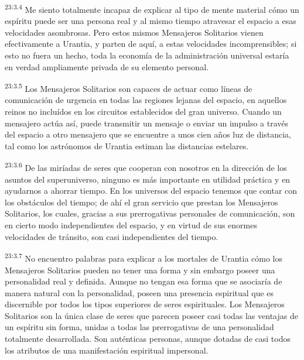 \par
\textsuperscript{23:3.4} Me siento totalmente incapaz de explicar al tipo de mente material cómo un espíritu puede ser una persona real y al mismo tiempo atravesar el espacio a esas velocidades asombrosas. Pero estos mismos Mensajeros Solitarios vienen efectivamente a Urantia, y parten de aquí, a estas velocidades incomprensibles; si esto no fuera un hecho, toda la economía de la administración universal estaría en verdad ampliamente privada de su elemento personal.

\par
\textsuperscript{23:3.5} Los Mensajeros Solitarios son capaces de actuar como líneas de comunicación de urgencia en todas las regiones lejanas del espacio, en aquellos reinos no incluídos en los circuitos establecidos del gran universo. Cuando un mensajero actúa así, puede transmitir un mensaje o enviar un impulso a través del espacio a otro mensajero que se encuentre a unos cien años luz de distancia, tal como los astrónomos de Urantia estiman las distancias estelares.

\par
\textsuperscript{23:3.6} De las miríadas de seres que cooperan con nosotros en la dirección de los asuntos del superuniverso, ninguno es más importante en utilidad práctica y en ayudarnos a ahorrar tiempo. En los universos del espacio tenemos que contar con los obstáculos del tiempo; de ahí el gran servicio que prestan los Mensajeros Solitarios, los cuales, gracias a sus prerrogativas personales de comunicación, son en cierto modo independientes del espacio, y en virtud de sus enormes velocidades de tránsito, son casi independientes del tiempo.

\par
\textsuperscript{23:3.7} No encuentro palabras para explicar a los mortales de Urantia cómo los Mensajeros Solitarios pueden no tener una forma y sin embargo poseer una personalidad real y definida. Aunque no tengan esa forma que se asociaría de manera natural con la personalidad, poseen una presencia espiritual que es discernible por todos los tipos superiores de seres espirituales. Los Mensajeros Solitarios son la única clase de seres que parecen poseer casi todas las ventajas de un espíritu sin forma, unidas a todas las prerrogativas de una personalidad totalmente desarrollada. Son auténticas personas, aunque dotadas de casi todos los atributos de una manifestación espiritual impersonal.


